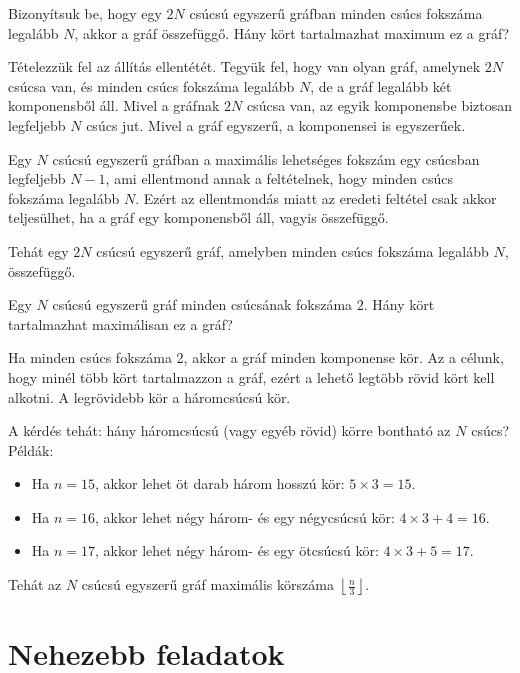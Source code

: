 \begin{problem}
	Bizonyítsuk be, hogy egy $2N$ csúcsú egyszerű gráfban minden csúcs fokszáma legalább $N$, akkor a gráf összefüggő.
	Hány kört tartalmazhat maximum ez a gráf?
\end{problem}
\begin{solution}
	Tételezzük fel az állítás ellentétét.
	Tegyük fel, hogy van olyan gráf, amelynek $2N$ csúcsa van, és minden csúcs fokszáma legalább $N$, de a gráf legalább két komponensből áll.
	Mivel a gráfnak $2N$ csúcsa van, az egyik komponensbe biztosan legfeljebb $N$ csúcs jut.
	Mivel a gráf egyszerű, a komponensei is egyszerűek.
	
	Egy $N$ csúcsú egyszerű gráfban a maximális lehetséges fokszám egy csúcsban legfeljebb $N-1$, ami ellentmond annak a feltételnek, hogy minden csúcs fokszáma legalább $N$.
	Ezért az ellentmondás miatt az eredeti feltétel csak akkor teljesülhet, ha a gráf egy komponensből áll, vagyis összefüggő.
	
	Tehát egy $2N$ csúcsú egyszerű gráf, amelyben minden csúcs fokszáma legalább $N$, összefüggő.
\end{solution}
\begin{problem}
	Egy $N$ csúcsú egyszerű gráf minden csúcsának fokszáma $2$. Hány kört tartalmazhat maximálisan ez a gráf?
\end{problem}
\begin{solution}
	Ha minden csúcs fokszáma 2, akkor a gráf minden komponense kör.
	Az a célunk, hogy minél több kört tartalmazzon a gráf, ezért a lehető legtöbb rövid kört kell alkotni.
	A legrövidebb kör a háromcsúcsú kör.
	
	A kérdés tehát: hány háromcsúcsú (vagy egyéb rövid) körre bontható az $N$ csúcs?
	Példák:
	\begin{itemize}
		\item Ha \(n = 15\), akkor lehet öt darab három hosszú kör: \(5 \times 3 = 15\).
		\item Ha \(n = 16\), akkor lehet négy három- és egy négycsúcsú kör: \(4 \times 3 + 4 = 16\).
		\item Ha \(n = 17\), akkor lehet négy három- és egy ötcsúcsú kör: \(4 \times 3 + 5 = 17\).
	\end{itemize}
	
	Tehát az $N$ csúcsú egyszerű gráf maximális körszáma $\left\lfloor \frac{n}{3} \right\rfloor$.
\end{solution}


\section*{Nehezebb feladatok}


